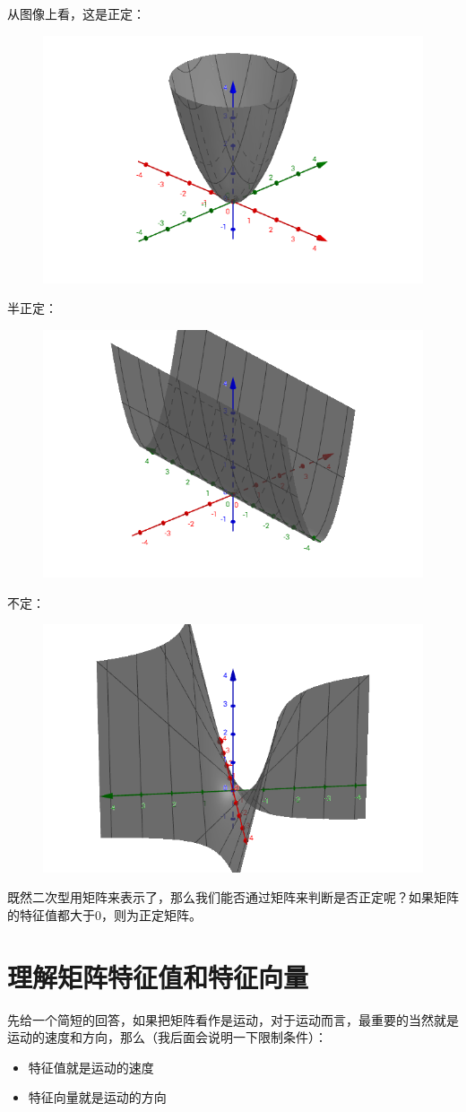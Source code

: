 \documentclass[12pt]{article}
\begin{document}
从图像上看，这是正定：
\begin{figure}[H]
    \centering
    \includegraphics[width=.5\textwidth]{fig/UnderstandQuadraticForm_11.png}
\end{figure} 

半正定：
\begin{figure}[H]
    \centering
    \includegraphics[width=.5\textwidth]{fig/UnderstandQuadraticForm_12.png}
\end{figure} 

不定：
\begin{figure}[H]
    \centering
    \includegraphics[width=.5\textwidth]{fig/UnderstandQuadraticForm_13.png}
\end{figure} 

既然二次型用矩阵来表示了，那么我们能否通过矩阵来判断是否正定呢？如果矩阵的特征值都大于0，则为正定矩阵。

\section{理解矩阵特征值和特征向量\cite{How_To_Understand_Eigen_Value_Vector}}
先给一个简短的回答，如果把矩阵看作是运动，对于运动而言，最重要的当然就是运动的速度和方向，那么（我后面会说明一下限制条件）：
\begin{itemize}
    \item 特征值就是运动的速度
    \item 特征向量就是运动的方向
\end{itemize}
\end{document}
